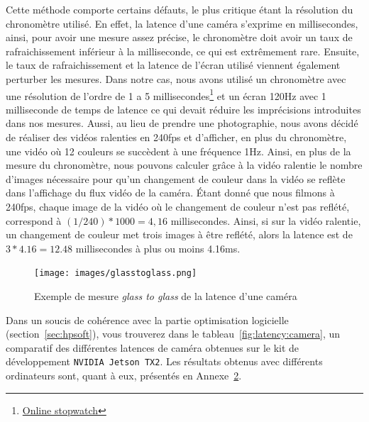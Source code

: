 Cette méthode comporte certains défauts, le plus critique étant la résolution du chronomètre utilisé. En effet, la latence d'une caméra s'exprime en millisecondes, ainsi, pour avoir une mesure assez précise, le chronomètre doit avoir un taux de rafraichissement inférieur à la milliseconde, ce qui est extrêmement rare. Ensuite, le taux de rafraichissement et la latence de l'écran utilisé viennent également perturber les mesures. Dans notre cas, nous avons utilisé un chronomètre avec une résolution de l'ordre de 1 a 5 millisecondes\footnote{\href{https://stopwatch.onlineclock.net/}{Online stopwatch}} et un écran 120Hz avec 1 milliseconde de temps de latence ce qui devait réduire les imprécisions introduites dans nos mesures. Aussi, au lieu de prendre une photographie, nous avons décidé de réaliser des vidéos ralenties en 240fps et d'afficher, en plus du chronomètre, une vidéo où 12 couleurs se succèdent à une fréquence 1Hz. Ainsi, en plus de la mesure du chronomètre, nous pouvons calculer grâce à la vidéo ralentie le nombre d'images nécessaire pour qu'un changement de couleur dans la vidéo se reflète dans l'affichage du flux vidéo de la caméra. Étant donné que nous filmons à 240fps, chaque image de la vidéo où le changement de couleur n'est pas reflété, correspond à $(1/240) * 1000 = 4,16$ millisecondes. Ainsi, si sur la vidéo ralentie, un changement de couleur met trois images à être reflété, alors la latence est de $3 * 4.16 = 12.48$ millisecondes à plus ou moins 4.16ms.

\begin{figure}[H]
\centering
\texttt{[image: images/glasstoglass.png]}
\caption{Exemple de mesure \emph{glass to glass} de la latence d'une caméra}
\label{fig:latency:glasstoglass}
\end{figure}

Dans un soucis de cohérence avec la partie optimisation logicielle (section~\ref{sec:hpsoft}), vous trouverez dans le tableau~\ref{fig:latency:camera}, un comparatif des différentes latences de caméra obtenues sur le kit de développement \texttt{NVIDIA Jetson TX2}. Les résultats obtenus avec différents ordinateurs sont, quant à eux, présentés en Annexe~\hyperref[annexe:camera]{2}.

\begin{table}[H]
\centering
\caption{Latence (en ms) de plusieurs caméras mesurée en \emph{glass to glass} - \texttt{NVIDIA Jetson TX2}}
\label{fig:latency:camera}
\end{table}

